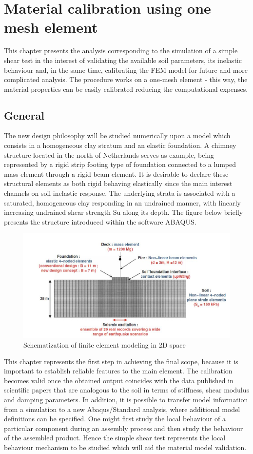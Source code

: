 \documentclass[12pt,a4paper]{report}
\begin{document}
\chapter{Material calibration using one mesh element}\label{ch3}
This chapter presents the analysis corresponding to the simulation of a simple shear test in the interest of validating the available soil parameters, its inelastic behaviour and, in the same time, calibrating the FEM model for future and more complicated analysis. The procedure works on a one-mesh element - this way, the material properties can be easily calibrated reducing the computational expenses. 

\section{General}
The new design philosophy will be studied numerically upon a model which consists in a homogeneous clay stratum and an elastic foundation.  A chimney structure located in the north of Netherlands serves as example, being represented by a rigid strip footing type of foundation connected to a lumped mass element through a rigid beam element. It is desirable to declare these structural elements as both rigid behaving elastically since the main interest channels on soil inelastic response. The underlying strata is associated with a saturated, homogeneous clay responding in an undrained manner, with linearly increasing undrained shear strength Su along its depth. The figure below briefly presents the structure introduced within the software ABAQUS.

\begin{figure}[h!]
	\centering
	\includegraphics[width=0.8\linewidth]{"scheme2D"}
	\caption{Schematization of finite element modeling in 2D space}
	\label{FEM2d}
\end{figure}

This chapter represents the first step in achieving the final scope, because it is important to establish reliable features to the main element. The calibration becomes valid once the obtained output coincides with the data published in scientific papers that are analogous to the soil in terms of stiffness, shear modulus and damping parameters. In addition, it is possible to transfer model information from a simulation to a new Abaqus/Standard analysis, where additional model definitions can be specified. One might first study the local behaviour of a particular component during an assembly process and then study the behaviour of the assembled product. Hence the simple shear test represents the local behaviour mechanism to be studied which will aid the material model validation. 
\end{document}
